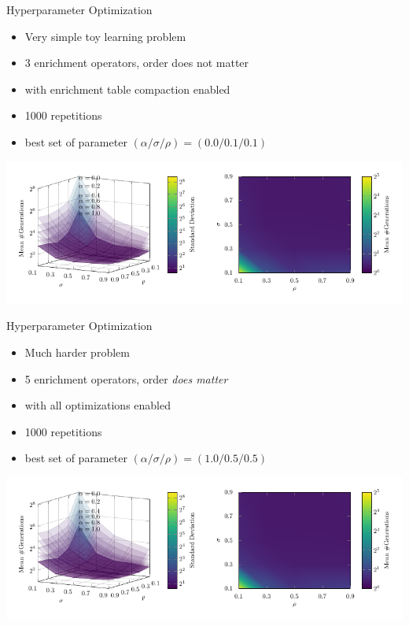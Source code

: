 \documentclass[aspectratio=1610,table]{beamer}
\begin{document}
\begin{frame}{Hyperparameter Optimization}
\begin{itemize}
  \item Very simple toy learning problem
  \item 3 enrichment operators, order does not matter
  \item with enrichment table compaction enabled
  \item 1000 repetitions
  \item best set of parameter $(\alpha/\sigma/\rho)=(0.0/0.1/0.1)$
\end{itemize}
\begin{center}
  \includegraphics[page=2]{gfx/graphs}
\end{center}
\end{frame}

\begin{frame}{Hyperparameter Optimization}
\begin{itemize}
  \item Much harder problem
  \item 5 enrichment operators, order \emph{does matter}
  \item with all optimizations enabled
  \item 1000 repetitions
  \item best set of parameter $(\alpha/\sigma/\rho)=(1.0/0.5/0.5)$
\end{itemize}
\begin{center}
  \includegraphics[page=3]{gfx/graphs}
\end{center}
\end{frame}
\end{document}
